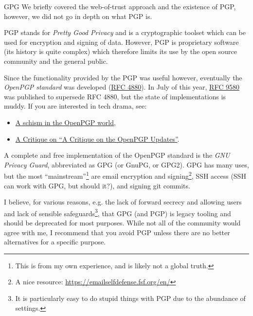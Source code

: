 \documentclass{homework}
\begin{document}
\begin{task}{GPG}
  We briefly covered the web-of-trust approach and the existence of PGP, however, we did not go in depth on what PGP is.

  PGP stands for \emph{Pretty Good Privacy} and is a cryptographic toolset which can be used for encryption and signing of data.
  However, PGP is proprietary software (its history is quite complex) which therefore limits its use by the open source community and the general public.

  Since the functionality provided by the PGP was useful however, eventually the \emph{OpenPGP standard} was developed (\href{https://datatracker.ietf.org/doc/html/rfc4880}{RFC 4880}).
  In July of this year, \href{https://datatracker.ietf.org/doc/html/rfc9580}{RFC 9580} was published to supersede RFC 4880, but the state of implementations is muddy.
  If you are interested in tech drama, see:
  \begin{itemize}
    \item \href{https://lwn.net/Articles/953797/}{A schism in the OpenPGP world},
    \item \href{https://blog.pgpkeys.eu/critique-critique.html}{A Critique on \enquote{A Critique on the OpenPGP Updates}}.
  \end{itemize}

  A complete and free implementation of the OpenPGP standard is the \emph{GNU Privacy Guard}, abbreviated as GPG (or GnuPG, or GPG2).
  GPG has many uses, but the most \enquote{mainstream}\footnote{This is from my own experience, and is likely not a global truth.} are email encryption and signing\footnote{A nice resource: \url{https://emailselfdefense.fsf.org/en/}}, SSH access (SSH can work with GPG, but should it?), and signing git commits\footnotemark{}.

  \begin{tcolorbox}
    I believe, for various reasons, e.g. the lack of forward secrecy and allowing users and lack of sensible safeguards\footnote{It is particularly easy to do stupid things with PGP due to the abundance of settings.}, that GPG (and PGP) is legacy tooling and should be deprecated for most purposes.
    While not all of the community would agree with me, I recommend that you avoid PGP unless there are no better alternatives for a specific purpose.
  \end{tcolorbox}


\end{task}
\end{document}
